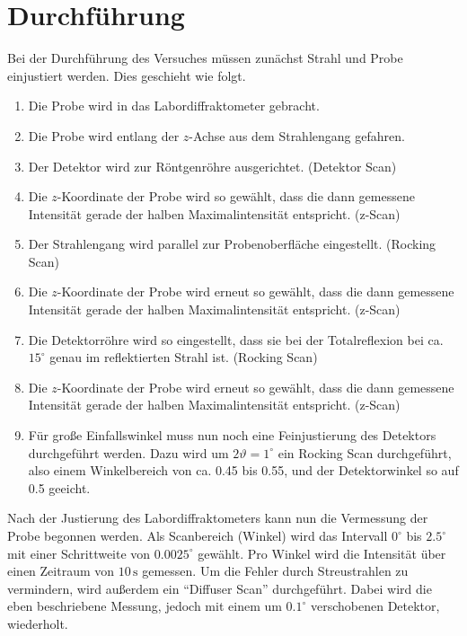 

\section{Durchführung}
Bei der Durchführung des Versuches müssen zunächst Strahl und Probe einjustiert
werden. Dies geschieht wie folgt.
\begin{enumerate}
\item Die Probe wird in das Labordiffraktometer gebracht.
\item Die Probe wird entlang der $z$-Achse aus dem Strahlengang gefahren.
\item Der Detektor wird zur Röntgenröhre ausgerichtet. (Detektor Scan)
\item Die $z$-Koordinate der Probe wird so gewählt, dass die dann gemessene
Intensität gerade der halben Maximalintensität entspricht. (z-Scan)
\item Der Strahlengang wird parallel zur Probenoberfläche eingestellt. (Rocking
Scan)
\item Die $z$-Koordinate der Probe wird erneut so gewählt, dass die dann
gemessene Intensität gerade der halben Maximalintensität entspricht. (z-Scan)
\item Die Detektorröhre wird so eingestellt, dass sie bei der Totalreflexion bei
ca. $15^\circ$ genau im reflektierten Strahl ist. (Rocking Scan)
\item Die $z$-Koordinate der Probe wird erneut so gewählt, dass die dann
gemessene Intensität gerade der halben Maximalintensität entspricht. (z-Scan)
\item Für große Einfallswinkel muss nun noch eine Feinjustierung des Detektors
durchgeführt werden. Dazu wird um $2\vartheta=1^\circ$ ein Rocking Scan
durchgeführt, also einem Winkelbereich von ca. 0.45 bis 0.55, und der
Detektorwinkel so auf 0.5 geeicht.
\end{enumerate}
Nach der Justierung des Labordiffraktometers kann nun die Vermessung der Probe
begonnen werden. Als Scanbereich (Winkel) wird das Intervall $0^\circ$ bis
$2.5^\circ$ mit einer Schrittweite von $0.0025^\circ$ gewählt. Pro Winkel
wird die Intensität über einen Zeitraum von $10 \, \text{s}$ gemessen. Um die
Fehler durch Streustrahlen zu vermindern, wird außerdem ein "`Diffuser Scan"'
durchgeführt. Dabei wird die eben beschriebene Messung, jedoch mit einem um
$0.1^\circ$ verschobenen Detektor, wiederholt.

